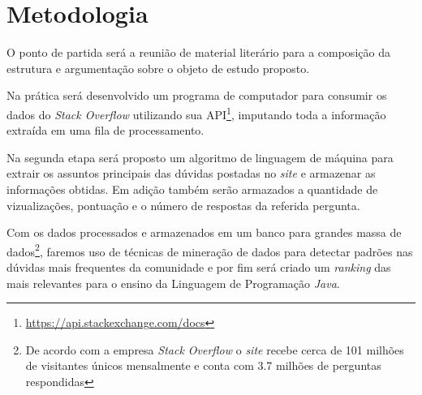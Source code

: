 
 
\chapter{Metodologia}\label{cap_exemplos}

O ponto de partida será a reunião de material literário para a composição da estrutura e argumentação sobre o objeto de estudo proposto.

Na prática será desenvolvido um programa de computador para consumir os dados do \textit{Stack Overflow} utilizando sua API\footnote{\url{https://api.stackexchange.com/docs}}, imputando toda a informação extraída em uma fila de processamento.

Na segunda etapa será proposto um algoritmo de linguagem de máquina \cite{Hulth:2003:IAK:1119355.1119383} para extrair os assuntos principais \cite{Turney:2000:LAK:593957.593993} das dúvidas postadas no \textit{site} e armazenar as informações obtidas. Em adição também serão armazados a quantidade de vizualizações, pontuação e o número de respostas da referida pergunta.  

Com os dados processados e armazenados em um banco para grandes massa de dados\footnote{De acordo com a empresa \textit{Stack Overflow} o \textit{site} recebe cerca de 101 milhões de visitantes únicos mensalmente e conta com 3.7 milhões de perguntas respondidas}, faremos uso de técnicas de mineração de dados para detectar padrões nas dúvidas mais frequentes da comunidade e por fim será criado um \textit{ranking} \cite{mihalcea-tarau:2004:EMNLP} das mais relevantes para o ensino da Linguagem de Programação \emph{Java}. 

